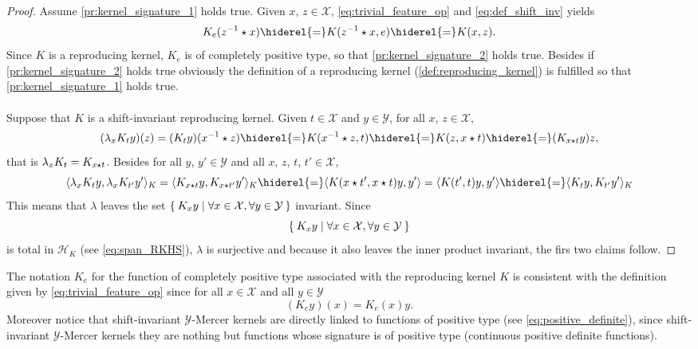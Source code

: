 \begin{proof} Assume \cref{pr:kernel_signature_1} holds true. Given $x$, $z\in\mathcal{X}$, \cref{eq:trivial_feature_op} and \cref{eq:def_shift_inv} yields
\begin{dmath*}
K_e(\inv{z}\groupop x)\hiderel{=}K(\inv{z} \groupop x,e)\hiderel{=}K(x,z).
\end{dmath*}
Since $K$ is a reproducing kernel, $K_e$ is of completely positive type, so that \cref{pr:kernel_signature_2} holds true. Besides if \cref{pr:kernel_signature_2} holds true obviously the definition of a reproducing kernel (\cref{def:reproducing_kernel}) is fulfilled so that \cref{pr:kernel_signature_1} holds true.
\paragraph{}
Suppose that $K$ is a shift-invariant reproducing kernel. Given $t\in\mathcal{X}$ and $y\in\mathcal{Y}$, for all $x$, $z\in\mathcal{X}$,
\begin{dmath*}
(\lambda_xK_ty)(z)=(K_ty)(\inv{x}\groupop z)\hiderel{=}K(\inv{x}\groupop z,t)\hiderel{=}K(z,x\groupop t)\hiderel{=}(K_{x\groupop t}y)z,
\end{dmath*}
that is $\lambda_xK_t=K_{x\star t}$. Besides for all $y$, $y'\in\mathcal{Y}$ and all $x$, $z$, $t$, $t'\in\mathcal{X}$,
\begin{dmath*}
\inner{\lambda_xK_ty, \lambda_xK_{t'}y'}_K=\inner{K_{x\groupop t}y, K_{x \groupop t'}y'}_K\hiderel{=}\inner{K(x \groupop t', x \groupop t)y,y'}=\inner{K(t',t)y, y'}\hiderel{=}\inner{K_ty, K_{t'}y'}_K
\end{dmath*}
This means that $\lambda$ leaves the set $\Set{K_xy|\forall x\in\mathcal{X}, \forall y\in\mathcal{Y}}$ invariant.
Since \begin{dmath*}
\Set{K_xy|\forall x\in\mathcal{X}, \forall y\in\mathcal{Y}}
\end{dmath*}
is total in $\mathcal{H}_K$ (see \cref{eq:span_RKHS}), $\lambda$ is surjective and because it also leaves the inner product invariant, the firs two claims follow.
\end{proof}
The notation $K_e$ for the function of completely positive type associated with the reproducing kernel $K$ is consistent with the definition given by \cref{eq:trivial_feature_op} since for all $x\in\mathcal{X}$ and all $y\in\mathcal{Y}$
\begin{dmath*}
(K_ey)(x)=K_e(x)y.
\end{dmath*}
Moreover notice that shift-invariant $\mathcal{Y}$-Mercer kernels are directly linked to functions of positive type (see \cref{eq:positive_definite}), since shift-invariant $\mathcal{Y}$-Mercer kernels they are nothing but functions whose signature is of positive type (continuous positive definite functions).

